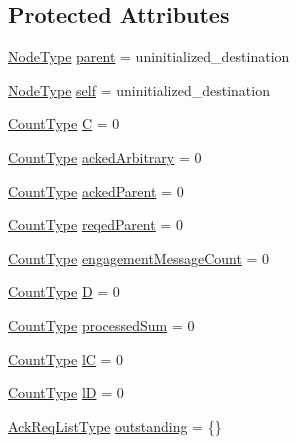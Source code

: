 \subsection*{Protected Attributes}
\begin{DoxyCompactItemize}
\item 
\hyperlink{namespacevt_a866da9d0efc19c0a1ce79e9e492f47e2}{Node\+Type} \hyperlink{structvt_1_1term_1_1ds_1_1_term_d_s_a904c12ccc672c4849af1cc6e89a91c54}{parent} = uninitialized\+\_\+destination
\item 
\hyperlink{namespacevt_a866da9d0efc19c0a1ce79e9e492f47e2}{Node\+Type} \hyperlink{structvt_1_1term_1_1ds_1_1_term_d_s_adadcd6e130836bc8d8a6819797f6900b}{self} = uninitialized\+\_\+destination
\item 
\hyperlink{structvt_1_1term_1_1ds_1_1_term_d_s_a54f4ebd7e1ecb59c32c0f5b03ef9f20b}{Count\+Type} \hyperlink{structvt_1_1term_1_1ds_1_1_term_d_s_a5d909caa14a0da42d9809d83e0f79f40}{C} = 0
\item 
\hyperlink{structvt_1_1term_1_1ds_1_1_term_d_s_a54f4ebd7e1ecb59c32c0f5b03ef9f20b}{Count\+Type} \hyperlink{structvt_1_1term_1_1ds_1_1_term_d_s_a3d2853955fae8dbf0180704c67e6eec2}{acked\+Arbitrary} = 0
\item 
\hyperlink{structvt_1_1term_1_1ds_1_1_term_d_s_a54f4ebd7e1ecb59c32c0f5b03ef9f20b}{Count\+Type} \hyperlink{structvt_1_1term_1_1ds_1_1_term_d_s_a694ea9720fa7137d823a58b55250119f}{acked\+Parent} = 0
\item 
\hyperlink{structvt_1_1term_1_1ds_1_1_term_d_s_a54f4ebd7e1ecb59c32c0f5b03ef9f20b}{Count\+Type} \hyperlink{structvt_1_1term_1_1ds_1_1_term_d_s_af2aced5d22eef80e3e4d1cf761f52693}{reqed\+Parent} = 0
\item 
\hyperlink{structvt_1_1term_1_1ds_1_1_term_d_s_a54f4ebd7e1ecb59c32c0f5b03ef9f20b}{Count\+Type} \hyperlink{structvt_1_1term_1_1ds_1_1_term_d_s_ad8d11aea5b48de393ba6f94c0ce8ed7e}{engagement\+Message\+Count} = 0
\item 
\hyperlink{structvt_1_1term_1_1ds_1_1_term_d_s_a54f4ebd7e1ecb59c32c0f5b03ef9f20b}{Count\+Type} \hyperlink{structvt_1_1term_1_1ds_1_1_term_d_s_afcfe54a5e5844f7483cd730c9970fe36}{D} = 0
\item 
\hyperlink{structvt_1_1term_1_1ds_1_1_term_d_s_a54f4ebd7e1ecb59c32c0f5b03ef9f20b}{Count\+Type} \hyperlink{structvt_1_1term_1_1ds_1_1_term_d_s_ad82335b84b7ac759e94fa524c59b03d9}{processed\+Sum} = 0
\item 
\hyperlink{structvt_1_1term_1_1ds_1_1_term_d_s_a54f4ebd7e1ecb59c32c0f5b03ef9f20b}{Count\+Type} \hyperlink{structvt_1_1term_1_1ds_1_1_term_d_s_a7b24d9eb35f71de23824ea8434a52cfd}{lC} = 0
\item 
\hyperlink{structvt_1_1term_1_1ds_1_1_term_d_s_a54f4ebd7e1ecb59c32c0f5b03ef9f20b}{Count\+Type} \hyperlink{structvt_1_1term_1_1ds_1_1_term_d_s_acd01a2b3778d0510fe35f6497f33eda9}{lD} = 0
\item 
\hyperlink{structvt_1_1term_1_1ds_1_1_term_d_s_a9d4102aa0577c3b077befc48c1a88842}{Ack\+Req\+List\+Type} \hyperlink{structvt_1_1term_1_1ds_1_1_term_d_s_a345a64aa827f72e541f9725f7ea2cbf8}{outstanding} = \{\}
\end{DoxyCompactItemize}
